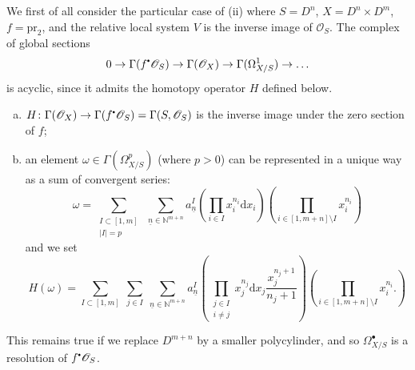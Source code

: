 \documentclass{report}
\theoremstyle{plain}
\theoremstyle{definition}
\newenvironment{env}[1]
    {\renewcommand\theinnercustomenv{#1}\innercustomenv}
    {\endinnercustomenv}
\newcommand{\sh}{\mathscr}
\newcommand{\sbullet}{{\mathbin{\vcenter{\hbox{\scalebox{.5}{$\bullet$}}}}}}
\newcommand{\NN}{\mathbb{N}}
\newcommand{\dd}{\mathrm{d}}
\newcommand{\pr}{\mathrm{pr}}
\newcommand{\oldpage}[1]{\marginpar{\footnotesize$\Big\vert$ \textit{p.~#1}}}
\begin{document}
\begin{env}{2.23.2}
\label{I.2.23.2}
  We first of all consider the particular case of (ii) where $S=D^n$, $X=D^n\times D^m$, $f=\pr_2$, and the relative local system $V$ is the inverse image of $\sh{O}_S$.
  The complex of global sections
  \[
    0 \to \Gamma(f^\sbullet\sh{O}_S) \to \Gamma(\sh{O}_X) \to \Gamma(\Omega_{X/S}^1) \to \ldots
  \]
  is acyclic, since it admits the homotopy operator $H$ defined below.
\oldpage{16}
  \begin{enumerate}[a)]
    \item $H\colon \Gamma(\sh{O}_X) \to \Gamma(f^\sbullet\sh{O}_S) = \Gamma(S,\sh{O}_S)$ is the inverse image under the zero section of $f$;
    \item an element $\omega\in\Gamma(\Omega_{X/S}^p)$ (where $p>0$) can be represented in a unique way as a sum of convergent series:
      \[
        \omega = \sum_{\substack{I\subset[1,m]\\|I|=p}} \; \sum_{\underline{n}\in \NN^{m+n}} a_{\underline{n}}^I
        \left(
          \prod_{i\in I} x_i^{n_i}\dd x_i
        \right)
        \left(
          \prod_{i\in[1,m+n]\setminus I} x_i^{n_i}
        \right)
      \]
      and we set
      \[
        H(\omega) = \sum_{I\subset[1,m]} \; \sum_{j\in I} \; \sum_{\underline{n}\in\NN^{m+n}} a_{\underline{n}}^I
        \left(
          \prod_{\substack{j\in I\\i\neq j}} x_j^{n_j}\dd x_j \frac{x_j^{n_j+1}}{n_j+1}
        \right)
        \left(
          \prod_{i\in[1,m+n]\setminus I} x_i^{n_i}.
        \right)
      \]
  \end{enumerate}

  This remains true if we replace $D^{m+n}$ by a smaller polycylinder, and so $\Omega_{X/S}^\bullet$ is a resolution of $f^\sbullet\sh{O}_S$.
\end{env}
\end{document}
